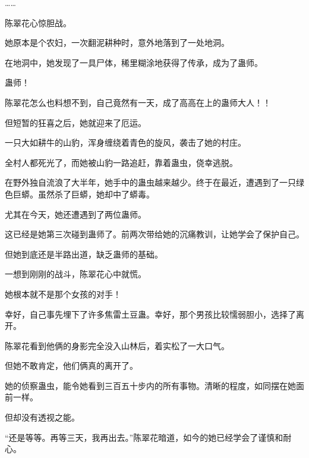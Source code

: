 \begin{this_body}
……

陈翠花心惊胆战。

她原本是个农妇，一次翻泥耕种时，意外地落到了一处地洞。

在地洞中，她发现了一具尸体，稀里糊涂地获得了传承，成为了蛊师。

蛊师！

陈翠花怎么也料想不到，自己竟然有一天，成了高高在上的蛊师大人！！

但短暂的狂喜之后，她就迎来了厄运。

一只大如耕牛的山豹，浑身缠绕着青色的旋风，袭击了她的村庄。

全村人都死光了，而她被山豹一路追赶，靠着蛊虫，侥幸逃脱。

在野外独自流浪了大半年，她手中的蛊虫越来越少。终于在最近，遭遇到了一只绿色巨蟒。虽然杀了巨蟒，她却中了蟒毒。

尤其在今天，她还遭遇到了两位蛊师。

这已经是她第三次碰到蛊师了。前两次带给她的沉痛教训，让她学会了保护自己。

但她到底还是半路出道，缺乏蛊师的基础。

一想到刚刚的战斗，陈翠花心中就慌。

她根本就不是那个女孩的对手！

幸好，自己事先埋下了许多焦雷土豆蛊。幸好，那个男孩比较懦弱胆小，选择了离开。

陈翠花看到他俩的身影完全没入山林后，着实松了一大口气。

但她不敢肯定，他们俩真的离开了。

她的侦察蛊虫，能令她看到三百五十步内的所有事物。清晰的程度，如同摆在她面前一样。

但却没有透视之能。

“还是等等。再等三天，我再出去。”陈翠花暗道，如今的她已经学会了谨慎和耐心。

\end{this_body}

